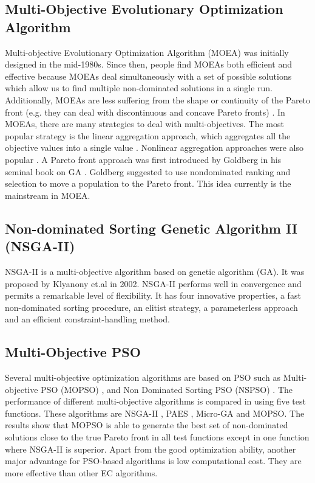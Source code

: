 \subsection{Multi-Objective Evolutionary Optimization Algorithm}
Multi-objective Evolutionary Optimization Algorithm (MOEA) was initially designed in the mid-1980s. Since then, people find MOEAs both efficient and
effective because MOEAs deal simultaneously with a set of possible solutions which allow us to find multiple non-dominated solutions in 
a single run. Additionally, MOEAs are less suffering from the shape or continuity of the Pareto front (e.g. they can deal with discontinuous and concave
Pareto fronts) \cite{abraham2005evolutionary}. In MOEAs, there are many strategies to deal with multi-objectives. 
The most popular strategy is the linear aggregation approach, 
which aggregates all the objective values into
a single value \cite{coello2006evolutionary}. Nonlinear aggregation approaches were also popular \cite{coello1998two}.
A Pareto front approach was first introduced by Goldberg in his seminal book on GA \cite{goldberg1988genetic}. Goldberg suggested to use nondominated ranking and selection to 
move a population to the Pareto front. This idea currently is the mainstream in MOEA.
\subsection{Non-dominated Sorting Genetic Algorithm II (NSGA-II)}
NSGA-II is a multi-objective algorithm based on genetic algorithm (GA). 
It was proposed by Klyanony et.al \cite{996017} in 2002.
NSGA-II performs well in convergence and permits a remarkable level of flexibility. It has four innovative properties, a fast non-dominated sorting 
procedure, an elitist strategy, a parameterless approach and an efficient constraint-handling method. 

\subsection{Multi-Objective PSO}
Several multi-objective optimization algorithms are based on PSO such as 
Multi-objective PSO (MOPSO) \cite{1304847}, and Non Dominated Sorting PSO (NSPSO) \cite{NSPSO}. 
The performance of different multi-objective algorithms is compared in \cite{1304847} using five test functions. 
These algorithms are NSGA-II \cite{996017}, PAES \cite{knowles2000}, Micro-GA \cite{Micro} and MOPSO. 
The results show that MOPSO is able to generate the best set of non-dominated solutions close to the true Pareto front in all test functions 
except in one function where NSGA-II is superior. Apart from the good optimization ability, another major advantage for PSO-based algorithms is low computational cost. 
They are more effective than other EC algorithms.

